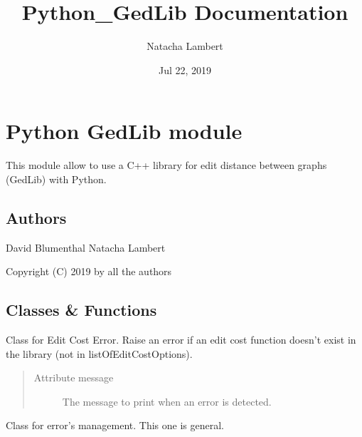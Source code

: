 \documentclass[letterpaper,10pt,english]{sphinxmanual}
\title{Python\_GedLib Documentation}
\date{Jul 22, 2019}
\author{Natacha Lambert}
\begin{document}
\maketitle
\tableofcontents
{}\label{index::doc}

\label{doc:module-PythonGedLib}

\chapter{Python GedLib module}
\label{doc:welcome-to-python-gedlib-s-documentation}\label{doc::doc}\label{doc:python-gedlib-module}
This module allow to use a C++ library for edit distance between graphs (GedLib) with Python.


\section{Authors}
\label{doc:authors}
David Blumenthal
Natacha Lambert

Copyright (C) 2019 by all the authors


\section{Classes \& Functions}
\label{doc:classes-functions}

\begin{fulllineitems}
\label{doc:PythonGedLib.EditCostError}
Class for Edit Cost Error. Raise an error if an edit cost function doesn't exist in the library (not in listOfEditCostOptions).
\begin{quote}\begin{description}
\item[{Attribute message}] \leavevmode
The message to print when an error is detected.

\end{description}\end{quote}

\end{fulllineitems}


\begin{fulllineitems}
\label{doc:PythonGedLib.Error}
Class for error's management. This one is general.

\end{fulllineitems}
\end{document}
